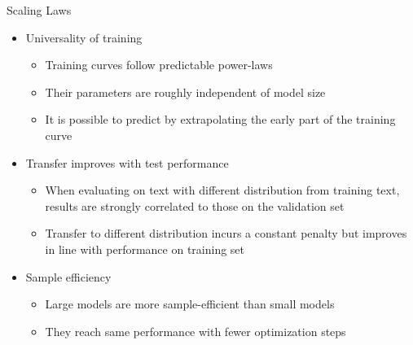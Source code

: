 
\begin{vbframe}{Scaling Laws}

\vfill

\begin{itemize}

	\item Universality of training
	\begin{itemize}
	\item Training curves follow predictable power-laws
	\item Their parameters are roughly independent of model size
	\item It is possible to predict by extrapolating the early part of the training curve
	\end{itemize}

	\item Transfer improves with test performance
	\begin{itemize}
	\item When evaluating on text with different distribution from training text, results are strongly correlated to those on the validation set
	\item Transfer to different distribution incurs a constant penalty but improves in line with performance on training set
	\end{itemize}

	\item Sample efficiency
	\begin{itemize}
	\item Large models are more sample-efficient than small models
	\item They reach same performance with fewer optimization steps
	\end{itemize}

\end{itemize}

\vfill

\end{vbframe}


